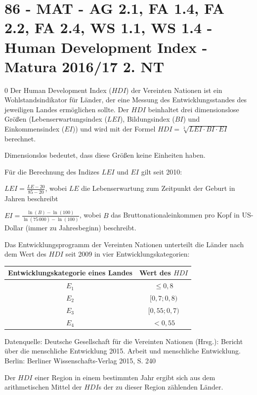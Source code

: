 \section{86 - MAT - AG 2.1, FA 1.4, FA 2.2, FA 2.4, WS 1.1, WS 1.4 - Human Development Index - Matura 2016/17 2. NT}

\begin{langesbeispiel} \item[0] %
Der Human Development Index ($HDI$) der Vereinten Nationen ist ein Wohlstandsindikator für Länder, der eine Messung des Entwicklungsstandes des jeweiligen Landes ermöglichen sollte.
Der $HDI$ beinhaltet drei dimensionslose Größen (Lebenserwartungsindex ($LEI$), Bildungsindex ($BI$)
und Einkommensindex ($EI$)) und wird mit der Formel $HDI=\sqrt[3]{LEI \cdot BI \cdot EI}$ berechnet.

Dimensionslos bedeutet, dass diese Größen keine Einheiten haben.\leer

Für die Berechnung des Indizes $LEI$ und $EI$ gilt seit 2010:

$LEI=\frac{LE-20}{85-20}$, wobei $LE$ die Lebenserwartung zum Zeitpunkt der Geburt in Jahren beschreibt

$EI=\frac{\ln(B)-\ln(100)}{\ln(75\,000)-\ln(100)}$, wobei $B$ das Bruttonationaleinkommen pro Kopf in US-Dollar (immer zu Jahresbeginn) beschreibt.\leer

Das Entwicklungsprogramm der Vereinten Nationen unterteilt die Länder nach dem Wert des $HDI$ seit 2009 in vier Entwicklungskategorien:


\renewcommand{\arraystretch}{1.5}
\begin{center}
\begin{tabular}{c|c} \hline
\rowcolor{lightgray} Entwicklungskategorie eines Landes & Wert des $HDI$ \\ \hline
$E_1$ & $\leq 0,8$ \\ \hline
$E_2$ & $[0,7; 0,8)$ \\ \hline
$E_3$ & $[0,55; 0,7)$ \\ \hline
$E_4$ & $< 0,55$ \\ \hline
\end{tabular}
\end{center}
\tiny Datenquelle: Deutsche Gesellschaft für die Vereinten
Nationen (Hrsg.): Bericht über die menschliche Entwicklung
2015. Arbeit und menschliche Entwicklung. Berlin:
Berliner Wissenschafts-Verlag 2015, S. 240 \normalsize


Der $HDI$ einer Region in einem bestimmten Jahr ergibt sich aus dem arithmetischen Mittel der $HDI$s der zu dieser Region zählenden Länder. \leer


\end{langesbeispiel}
